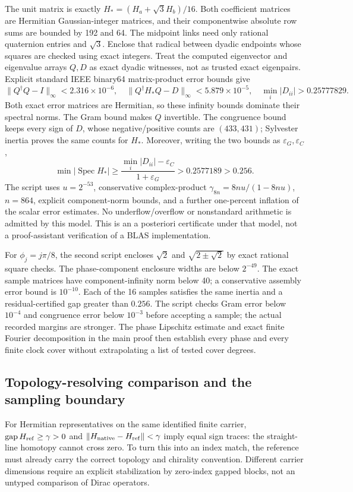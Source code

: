 \documentclass[12pt,a4paper]{article}
\begin{document}
The unit matrix is exactly \(H_*=(H_a+\sqrt3H_b)/16\).
Both coefficient matrices are Hermitian Gaussian-integer matrices, and
their componentwise absolute row sums are bounded by 192 and 64.  The
midpoint links need only rational quaternion entries and \(\sqrt3\).
Enclose that radical between dyadic endpoints whose squares are checked
using exact integers.  Treat the computed eigenvector and eigenvalue arrays
\(Q,D\) as exact dyadic witnesses, not as trusted exact eigenpairs.
Explicit standard IEEE binary64 matrix-product error bounds give
\[
 \|Q^\dagger Q-I\|_\infty<2.316\times10^{-6},\quad
 \|Q^\dagger H_*Q-D\|_\infty<5.879\times10^{-5},\quad
 \min_i|D_{ii}|>0.25777829.
\]
Both exact error matrices are Hermitian, so these infinity bounds dominate
their spectral norms.  The Gram bound makes \(Q\) invertible.  The
congruence bound keeps every sign of \(D\), whose negative/positive counts
are \((433,431)\); Sylvester inertia proves the same counts for \(H_*\).
Moreover, writing the two bounds as \(\varepsilon_G,\varepsilon_C\),
\[
 \min|\operatorname{Spec}H_*|
 \ge\frac{\min_i|D_{ii}|-\varepsilon_C}{1+\varepsilon_G}
 >0.2577189>0.256.
\]
The script uses \(u=2^{-53}\), conservative complex-product
\(\gamma_{8n}=8nu/(1-8nu)\), \(n=864\), explicit component-norm
bounds, and a further one-percent inflation of the scalar error estimates.
No underflow/overflow or nonstandard arithmetic is admitted by this model.
This is an a posteriori certificate under that model, not a proof-assistant
verification of a BLAS implementation.

For \(\phi_j=j\pi/8\), the second script encloses
\(\sqrt2\) and \(\sqrt{2\pm\sqrt2}\) by exact rational square checks.
The phase-component enclosure widths are below \(2^{-49}\).  The exact
sample matrices have component-infinity norm below 40; a conservative
assembly error bound is \(10^{-10}\).  Each of the 16 samples satisfies
the same inertia and a residual-certified gap greater than \(0.256\).
The script checks Gram error below \(10^{-4}\) and congruence error below
\(10^{-3}\) before accepting a sample; the actual recorded margins are
stronger.  The phase Lipschitz estimate and exact finite Fourier
decomposition in the main proof then establish every phase and every finite
clock cover without extrapolating a list of tested cover degrees.


\subsection{Topology-resolving comparison and the sampling boundary}
\label{p10:app:v199-topology-comparison}
For Hermitian representatives on the same identified finite carrier,
\(\operatorname{gap}H_{\rm ref}\ge\gamma>0\) and
\(\|H_{\rm native}-H_{\rm ref}\|<\gamma\) imply equal sign traces:
the straight-line homotopy cannot cross zero.  To turn this into an index
match, the reference must already carry the correct topology and chirality
convention.  Different carrier dimensions require an explicit stabilization
by zero-index gapped blocks, not an untyped comparison of Dirac operators.
\end{document}
